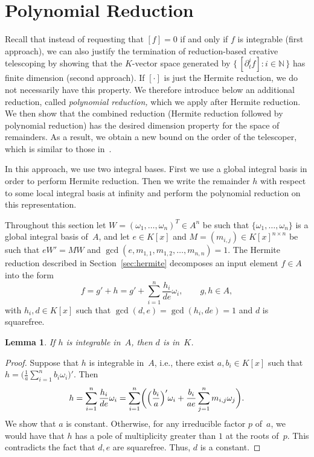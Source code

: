 \documentclass{sig-alternate-05-2015}
\newtheorem{lemma}[theorem]{Lemma}
\let\set\mathbb
\begin{document}
\section{Polynomial Reduction}\label{sec:polynomial}

Recall that instead of requesting that $[f]=0$ if and only if $f$ is integrable
(first approach), we can also justify the termination of reduction-based
creative telescoping by showing that the $K$-vector space generated by $\{\,[\partial_t^if]:i\in\set N\,\}$
has finite dimension (second approach). If $[\cdot]$ is just the Hermite
reduction, we do not necessarily have this property. We therefore introduce below an
additional reduction, called \emph{polynomial reduction,} which we apply after
Hermite reduction. We then show that the combined reduction (Hermite reduction
followed by polynomial reduction) has the desired dimension property for the
space of remainders. As a result, we obtain a new bound on the order of the
telescoper, which is similar to those in~\cite{chen12d,chen14a}.

In this approach, we use two integral bases. First we use a global integral basis
in order to perform Hermite reduction. Then we write the
remainder $h$ with respect to some local integral basis at infinity and perform the
polynomial reduction on this representation.

Throughout this section let $W=(\omega_1,\ldots,\omega_n)^T\in A^n$ be such
that $\{\omega_1, \ldots, \omega_n\}$ is a global integral basis of~$A$, and
let $e\in K[x]$ and $M=(m_{i,j})\in K[x]^{n\times n}$ be such that $eW'=MW$
and $\gcd(e, m_{1, 1}, m_{1, 2}, \ldots, m_{n ,n})=1$. The Hermite reduction
described in Section~\ref{sec:hermite} decomposes an input element $f\in A$
into the form
\[
  f = g' + h = g' + \sum_{i=1}^n \frac{h_i}{de} \omega_i,\qquad
  g, h\in A,
\]
with $h_i, d\in K[x]$ such that $\gcd(d, e)=\gcd(h_i,de)=1$ and $d$ is squarefree.
\begin{lemma}\label{LEM:d}
If $h$ is integrable in~$A$, then $d$ is in~$K$.
\end{lemma}
\begin{proof}
Suppose that $h$ is integrable in~$A$, i.e., there exist $a, b_i\in K[x]$
such that $h = \bigl(\frac{1}{a}\sum_{i=1}^n b_i \omega_i\bigr)'$. Then
\[
  h = \sum_{i=1}^n \frac{h_i}{de}\omega_i= \sum_{i=1}^n \biggl(\Bigl(\frac{b_i}{a}\Bigr)' \omega_i +
  \frac{b_i}{a e} \sum_{j=1}^n  m_{i, j}\omega_j\biggr).
\]
We show that $a$ is constant. Otherwise, for any irreducible factor $p$ of~$a$, we would have that $h$ has a pole of
multiplicity greater than $1$ at the roots of~$p$. This contradicts
the fact that $d, e$ are squarefree. Thus, $d$ is a constant.
\end{proof}
\end{document}
